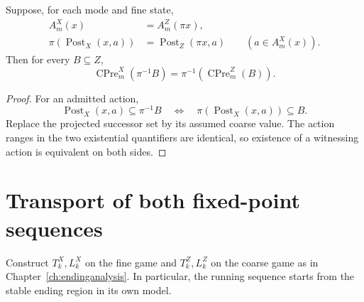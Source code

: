 \begin{lemma}\label{r:control-predecessor}
Suppose, for each mode and fine state,
\begin{align*}
 A^X_m(x)&=A^Z_m(\pi x),\\
 \pi(\operatorname{Post}_X(x,a))&=\operatorname{Post}_Z(\pi x,a)
 \qquad(a\in A^X_m(x)).
\end{align*}
Then for every $B\subseteq Z$,
\[
 \operatorname{CPre}^X_m(\pi^{-1}B)
 =\pi^{-1}(\operatorname{CPre}^Z_m(B)).
\]
\end{lemma}
\begin{proof}
For an admitted action,
\[
 \operatorname{Post}_X(x,a)\subseteq\pi^{-1}B
 \quad\Longleftrightarrow\quad
 \pi(\operatorname{Post}_X(x,a))\subseteq B.
\]
Replace the projected successor set by its assumed coarse value. The action ranges in the two existential quantifiers are identical, so existence of a witnessing action is equivalent on both sides.
\end{proof}

\section{Transport of both fixed-point sequences}
Construct $T^X_k,L^X_k$ on the fine game and $T^Z_k,L^Z_k$ on the coarse game as in Chapter~\ref{ch:endinganalysis}. In particular, the running sequence starts from the stable ending region in its own model.

